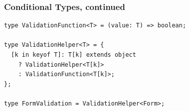\documentclass[aspectratio=169]{beamer}
\begin{document}
\begin{frame}[fragile]
  \frametitle{Conditional Types, continued}

  \begin{verbatim}
type ValidationFunction<T> = (value: T) => boolean;

type ValidationHelper<T> = {
  [k in keyof T]: T[k] extends object
    ? ValidationHelper<T[k]>
    : ValidationFunction<T[k]>;
};

type FormValidation = ValidationHelper<Form>;
\end{verbatim}
\end{frame}
\end{document}
